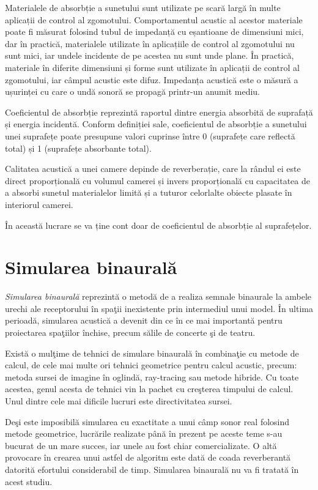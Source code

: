 	Materialele de absorbție a sunetului sunt utilizate pe scară largă în multe aplicații de control al zgomotului. Comportamentul acustic al acestor materiale poate fi măsurat folosind tubul de impedanță cu eșantioane de dimensiuni mici, dar în practică, materialele utilizate în aplicațiile de control al zgomotului nu sunt mici, iar undele incidente de pe acestea nu sunt unde plane. În practică, materiale în diferite dimensiuni și forme sunt utilizate în aplicații de control al zgomotului, iar câmpul acustic este difuz. Impedanța acustică este o măsură a ușurinței cu care o undă sonoră se propagă printr-un anumit mediu.
	
	Coeficientul de absorbție reprezintă raportul dintre energia absorbită de suprafață și energia incidentă. Conform definiției sale, coeficientul de absorbție a sunetului unei suprafețe poate presupune valori cuprinse între 0 (suprafețe care reflectă total) și 1 (suprafețe absorbante total).
	
	Calitatea acustică a unei camere depinde de reverberație, care la rândul ei este direct proporțională cu volumul camerei și invers proporțională cu capacitatea de a absorbi sunetul materialelor limită și a tuturor celorlalte obiecte plasate în interiorul camerei.
	
	În această lucrare se va ține cont doar de coeficientul de absorbție al suprafețelor.
	
	\section{Simularea binaural\u{a}}
	
	\textit{Simularea binaural\u{a}} reprezint\u{a} o metod\u{a} de a realiza semnale binaurale la ambele urechi ale receptorului \^{i}n spa\c{t}ii inexistente prin intermediul unui model. \^{I}n ultima perioad\u{a}, simularea acustic\u{a} a devenit din ce \^{i}n ce mai important\u{a} pentru proiectarea spa\c{t}iilor \^{i}nchise, precum s\u{a}lile de concerte \c{s}i de teatru.
	 
	
	Exist\u{a} o mul\c{t}ime de tehnici de simulare binaural\u{a} \^{i}n combina\c{t}ie cu metode de calcul, de cele mai multe ori tehnici geometrice pentru calcul acustic, precum: metoda sursei de imagine \^{i}n oglind\u{a}, ray-tracing sau metode hibride. Cu toate acestea, genul acesta de tehnici vin la pachet cu cre\c{s}terea timpului de calcul. Unul dintre cele mai dificile lucruri este directivitatea sursei.
	
	 
	De\c{s}i este imposibil\u{a} simularea cu exactitate a unui c\^{a}mp sonor real folosind metode geometrice, lucr\u{a}rile realizate p\^{a}n\u{a} \^{i}n prezent pe aceste teme s-au bucurat de un mare succes, iar unele au fost chiar comercializate. O alt\u{a} provocare \^{i}n crearea unui astfel de algoritm este dat\u{a} de coada reverberant\u{a} datorit\u{a} efortului considerabil de timp. Simularea binaural\u{a} nu va fi tratat\u{a} \^{i}n acest studiu.
	
